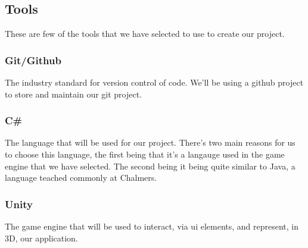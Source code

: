 \subsection{Tools}
These are few of the tools that we have selected to use to create our project.

\subsubsection{Git/Github}
The industry standard for version control of code. 
We'll be using a github project to store and maintain our git project.

\subsubsection{C\#}
The language that will be used for our project. 
There's two main reasons for us to choose this language, the first being that it's a langauge used in the game engine that we have selected. 
The second being it being quite similar to Java, a language teached commonly at Chalmers.

\subsubsection{Unity}
The game engine that will be used to interact, via ui elements, and represent, in 3D, our application. 
